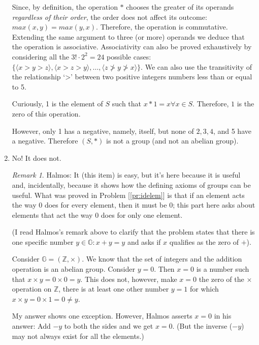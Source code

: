 \documentclass[english,notitlepage,smartquotes]{hgbreport}
\theoremstyle{definition}
\theoremstyle{definition}
\theoremstyle{remark}
\newtheorem*{remark}{Remark}
\theoremstyle{definition}
\theoremstyle{plain}
\theoremstyle{definition}
\begin{document}
\begin{enumerate}
Since, by definition, the operation $*$ chooses the greater of its operands \emph{regardless of their order}, the order does not affect its outcome: $max(x,y)=max(y,x)$. Therefore, the operation is commutative. Extending the same argument to three (or more) operands we deduce that the operation is associative. Associativity can also be proved exhaustively by considering all the $3!\cdot 2^2=24$ possible cases: $\{\langle x>y>z\rangle,\langle x>z>y\rangle,\dots,\langle z\ngtr y \ngtr x\rangle\}$. We can also use the transitivity of the relationship `>' between two positive integers numbers less than or equal to 5.

Curiously, 1 is the element of $S$ such that $x*1=x\forall x\in S$. Therefore, $1$ is the zero of this operation.

However, only 1 has a negative, namely, itself, but none of $2,3,4$, and 5 have a negative. Therefore $(S,*)$ is not a group (and not an abelian group).

\item\label{item:xyyx0s} No! It does not.

\begin{remark}
Halmos: It (this item) is easy, but it's here because it is useful and, incidentally, because it shows how the defining axioms of groups can be useful. What was proved in Problem [\ref{pr:idelem}] is that if an element acts the way 0 does for every element, then it must be 0; this part here asks about elements that act the way 0 does for only
one element.
\end{remark}
(I read Halmos's remark above to clarify that the problem states that there is one specific number $y\in\mathbb{G}: x+y=y$ and asks if $x$ qualifies as the zero of $+$).

Consider $\mathbb{G}=(\mathbb Z,\times)$. We know that the set of integers and the addition operation is an abelian group. Consider $y=0$. Then $x=0$ is a number such that $x\times y=0\times 0=y$. This does not, however, make $x=0$ the zero of the $\times$ operation on $\mathbb Z$, there is at least one other number $y=1$ for which $x\times y=0\times 1=0\ne y$.

My answer shows one exception. However, Halmos asserts $x=0$ in his answer: Add $-y$ to both the sides and we get $x=0$. (But the inverse ($-y$) may not always exist for all the elements.)
\end{enumerate}
\end{document}
